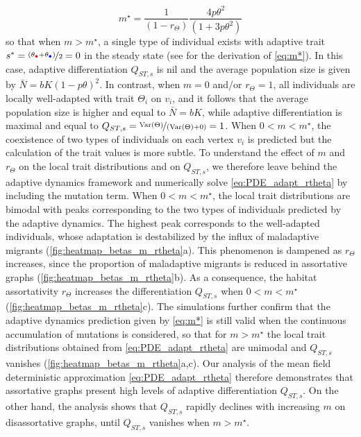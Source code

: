 \begin{equation}\label{eq:m*}
    m^\star = \frac{1}{(1-r_\Theta)}\frac{4 p \theta^2}{(1 + 3 p \theta^2)}
\end{equation}
so that when $m > m^\star$, a single type of individual exists with adaptive trait $s^* = \nicefrac{\left(\theta_{\rcirc} + \theta_{\bcirc}\right)}{2} = 0$ in the steady state (see  for the derivation of \cref{eq:m*}). In this case, adaptive differentiation $Q_{ST,s}$ is nil and the average population size is given by $\bar{N} = bK(1-p\theta)^2$.
%
In contrast, when $m=0$ and/or $r_\Theta = 1$, all individuals are locally well-adapted with trait $\Theta_i$ on $v_i$, and it follows that the average population size is higher and equal to $\bar{N} = bK$, while adaptive differentiation is maximal and equal to $Q_{ST,s} = \nicefrac{{\operatorname{Var}}(\Theta)}{\left({\operatorname{Var}}(\Theta) + 0\right)} = 1$. 
%
When $0 < m < m^\star$, the coexistence of two types of individuals on each vertex $v_i$ is predicted but the calculation of the trait values is more subtle.
%
To understand the effect of $m$ and $r_\Theta$ on the local trait distributions and on $Q_{ST,s}$, we therefore leave behind the adaptive dynamics framework and numerically solve \cref{eq:PDE_adapt_rtheta} by including the mutation term. When $0 < m < m^\star$, the local trait distributions are bimodal with peaks corresponding to the two types of individuals predicted by the adaptive dynamics. The highest peak corresponds to the well-adapted individuals, whose adaptation is destabilized by the influx of maladaptive migrants (\cref{fig:heatmap_betas_m_rtheta}a). This phenomenon is dampened as $r_\Theta$ increases, since the proportion of maladaptive migrants is reduced in assortative graphs (\cref{fig:heatmap_betas_m_rtheta}b).
%
As a consequence, the habitat assortativity $r_\Theta$ increases the differentiation $Q_{ST,s}$ when $ 0 < m < m^\star$ (\cref{fig:heatmap_betas_m_rtheta}c). The simulations further confirm that the adaptive dynamics prediction given by \cref{eq:m*} is still valid when the continuous accumulation of mutations is considered, so that for $m > m^\star$ the local trait distributions obtained from \cref{eq:PDE_adapt_rtheta} are unimodal and $Q_{ST,s}$ vanishes (\cref{fig:heatmap_betas_m_rtheta}a,c). Our analysis of the mean field deterministic approximation \cref{eq:PDE_adapt_rtheta} therefore demonstrates that assortative graphs present high levels of adaptive differentiation $Q_{ST,s}$. On the other hand, the analysis shows that $Q_{ST,s}$ rapidly declines with increasing $m$ on disassortative graphs, until $Q_{ST,s}$ vanishes when $m > m^\star$.

